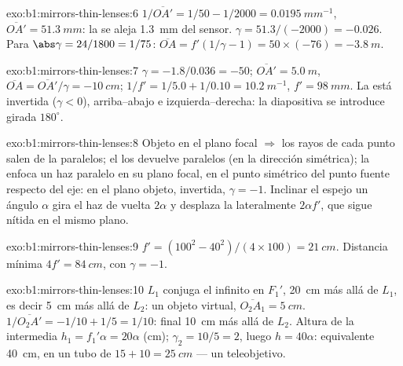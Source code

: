 \begin{solution}{exo:b1:mirrors-thin-lenses:6}
$1/\overline{OA'} = 1/50 - 1/2000 = \qty{0.0195}{mm^{-1}}$,
$\overline{OA'} = \qty{51.3}{mm}$: la  se aleja \qty{1.3}{mm} del
sensor. $\gamma = 51.3/(-2000) = -0.026$. Para $\abs\gamma = 24/1800
= 1/75$: $\overline{OA} = f'(1/\gamma - 1) = 50 \times (-76) =
\qty{-3.8}{m}$.
\end{solution}

\begin{solution}{exo:b1:mirrors-thin-lenses:7}
$\gamma = -1.8/0.036 = -50$; $\overline{OA'} = \qty{5.0}{m}$,
$\overline{OA} = \overline{OA'}/\gamma = \qty{-10}{cm}$;
$1/f' = 1/5.0 + 1/0.10 = \qty{10.2}{m^{-1}}$, $f' = \qty{98}{mm}$. La
 está invertida ($\gamma < 0$), arriba--abajo e izquierda--derecha:
la diapositiva se introduce girada $180^\circ$.
\end{solution}

\begin{solution}{exo:b1:mirrors-thin-lenses:8}
Objeto en el plano focal $\Rightarrow$ los rayos de cada punto salen de la
 paralelos; el  los devuelve paralelos (en la dirección
simétrica); la  enfoca un haz paralelo en su plano focal, en el punto
simétrico del punto fuente respecto del eje:  en el plano objeto,
invertida, $\gamma = -1$. Inclinar el espejo un ángulo $\alpha$ gira el
haz de vuelta $2\alpha$ y desplaza la  lateralmente
$2\alpha f'$, que sigue nítida en el mismo plano.
\end{solution}

\begin{solution}{exo:b1:mirrors-thin-lenses:9}
$f' = (100^2 - 40^2)/(4 \times 100) = \qty{21}{cm}$. Distancia mínima
$4f' = \qty{84}{cm}$, con $\gamma = -1$.
\end{solution}

\begin{solution}{exo:b1:mirrors-thin-lenses:10}
$L_1$ conjuga el infinito en $F_1'$, \qty{20}{cm} más allá de $L_1$, es decir \qty{5}{cm}
más allá de $L_2$: un objeto virtual, $\overline{O_2A_1} = \qty{+5}{cm}$.
$1/\overline{O_2A'} = -1/10 + 1/5 = 1/10$:  final \qty{10}{cm}
más allá de $L_2$. Altura de la  intermedia $h_1 = f_1'\alpha = 20\alpha$ (cm);
$\gamma_2 = 10/5 = 2$, luego $h = 40\alpha$:  equivalente
\qty{40}{cm}, en un tubo de $15 + 10 = \qty{25}{cm}$ --- un teleobjetivo.
\end{solution}

